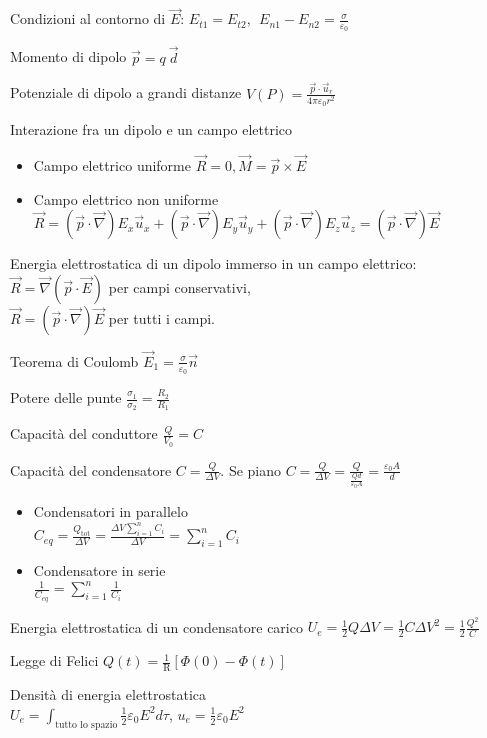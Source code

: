 \documentclass[8pt,a4paper]{article}
\numberwithin{equation}{subsection}
\begin{document}
\begin{multicols}{2}
Condizioni al contorno di $\vec{E}$: $E_{t1} =E_{t2} ,\ \ E_{n1} -E_{n2} =\frac{\sigma }{\varepsilon _{0}}$

Momento di dipolo $\vec{p} =q\ \vec{d}$

Potenziale di dipolo a grandi distanze $V(P)=\frac{\vec{p} \cdot \vec{u}_{r}}{4\pi \varepsilon _{0} r^{2}}$

Interazione fra un dipolo e un campo elettrico
\begin{itemize}
\item Campo elettrico uniforme $\vec{R} =0,\vec{M} =\vec{p} \times \vec{E}$
\item Campo elettrico non uniforme $\vec{R} =(\vec{p} \cdot \vec{\nabla }) E_{x}\vec{u}_{x} +(\vec{p} \cdot \vec{\nabla }) E_{y}\vec{u}_{y} +(\vec{p} \cdot \vec{\nabla }) E_{z}\vec{u}_{z} =(\vec{p} \cdot \vec{\nabla })\vec{E}$
\end{itemize}

Energia elettrostatica di un dipolo immerso in un campo elettrico: \\$\vec{R} =\vec{\nabla } (\vec{p} \cdot \vec{E} )$ per campi conservativi, \\$\vec{R} =(\vec{p} \cdot \vec{\nabla } )\vec{E}$ per tutti i campi.

Teorema di Coulomb $\vec{E}_{1} =\frac{\sigma }{\varepsilon _{0}}\vec{n}$

Potere delle punte $\frac{\sigma _{1}}{\sigma _{2}} =\frac{R_{2}}{R_{1}}$

Capacità del conduttore $\frac{Q}{V_{0}} =C$

Capacità del condensatore $C=\frac{Q}{\Delta V}$. Se piano $C=\frac{Q}{\Delta V} =\frac{Q}{\frac{Qd}{\varepsilon _{0} A}} =\frac{\varepsilon _{0} A}{d}$
\begin{itemize}
\item Condensatori in parallelo \\$C_{eq} =\frac{Q_{\text{tot}}}{\Delta V} =\frac{\Delta V\sum ^{n}_{i=1} C_{i}}{\Delta V} =\sum ^{n}_{i=1} C_{i}$
\item Condensatore in serie \\$\frac{1}{C_{eq}} =\sum ^{n}_{i=1}\frac{1}{C_{i}}$
\end{itemize}

Energia elettrostatica di un condensatore carico $U_{e} =\frac{1}{2} Q\Delta V=\frac{1}{2} C\Delta V^{2} =\frac{1}{2}\frac{Q^{2}}{C}$

Legge di Felici $Q(t)=\frac{1}{\mathrm{R}} [\Phi (0)-\Phi (t)]$

Densità di energia elettrostatica \\$U_{e} =\int _{\text{tutto lo spazio}}\frac{1}{2} \varepsilon _{0} E^{2} d\tau $, $u_{e} =\frac{1}{2} \varepsilon _{0} E^{2}$


\end{multicols}
\end{document}
